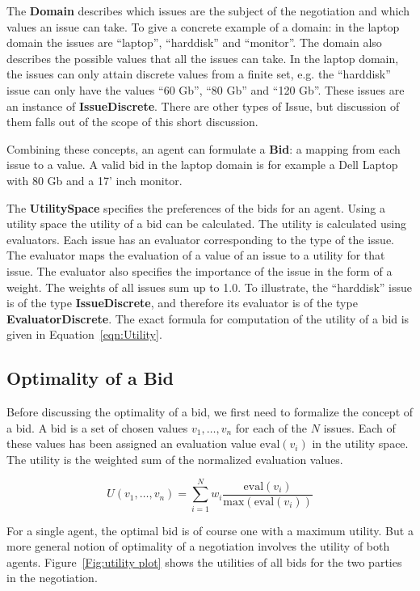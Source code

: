 \documentclass[]{article}
\begin{document}
The {\bf Domain} describes which issues are the subject of the negotiation and which values an issue can take. To give a concrete example of a domain: in the laptop domain the issues are ``laptop'', ``harddisk'' and ``monitor''. The domain also describes the possible values that all the issues can take. In the laptop domain, the issues can only attain discrete values from a finite set, e.g. the ``harddisk'' issue can only have the values ``60 Gb'', ``80 Gb'' and ``120 Gb''. These issues are an instance of \textbf{IssueDiscrete}. There are other types of Issue, but discussion of them falls out of the scope of this short discussion.

Combining these concepts, an agent can formulate a \textbf{Bid}: a mapping from each issue to a value. A valid bid in the laptop domain is for example a Dell Laptop with 80 Gb and a 17' inch monitor.

The {\bf UtilitySpace} specifies the preferences of the bids for an agent. Using a utility space the utility of a bid can be calculated. The utility is calculated using evaluators. Each issue has an evaluator corresponding to the type of the issue. The evaluator maps the evaluation of a value of an issue to a utility for that issue. The evaluator also specifies the importance of the issue in the form of a weight. The weights of all issues sum up to 1.0. To illustrate, the ``harddisk'' issue is of the type \textbf{IssueDiscrete}, and therefore its evaluator is of the type \textbf{EvaluatorDiscrete}. The exact formula for computation of the utility of a bid is given in Equation~\ref{eqn:Utility}.

\subsection{Optimality of a Bid}
Before discussing the optimality of a bid, we first need to formalize the concept of a bid. A bid is a set of chosen values $v_1, \ldots, v_n$  for each of the $N$ issues. Each of these values has been assigned an evaluation value $\text{eval}(v_i)$ in the utility space. The utility is the weighted sum of the normalized evaluation values.

\begin{equation}
	U(v_1, \ldots, v_n) = \sum_{i=1}^{N} w_i \dfrac{\text{eval}(v_i)}{\text{max}(\text{eval}(v_i))}
	\label{eqn:Utility}
\end{equation}

For a single agent, the optimal bid is of course one with a maximum utility. But a more general notion of optimality of a negotiation involves the utility of both agents. Figure~\ref{Fig:utility plot} shows the utilities of all bids for the two parties in the negotiation. 
 
\end{document}
